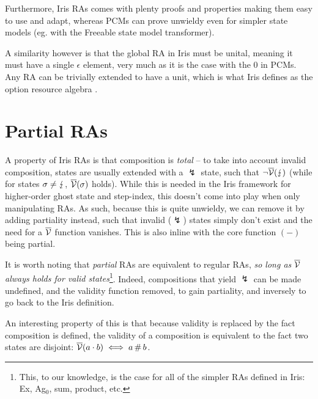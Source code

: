 Furthermore, Iris RAs comes with plenty proofs and properties making them easy to use and adapt, whereas PCMs can prove unwieldy even for simpler state models (eg. with the Freeable state model transformer).

A similarity however is that the global RA in Iris must be unital, meaning it must have a single $\epsilon$ element, very much as it is the case with the 0 in PCMs. Any RA can be trivially extended to have a unit, which is what Iris defines as the option resource algebra \cite{iris-option}.

\section{Partial RAs}

A property of Iris RAs is that composition is \emph{total} -- to take into account invalid composition, states are usually extended with a $\lightning$ state, such that $\neg \overline{\cal V}(\lightning)$ (while for states $\sigma\neq\lightning$, $\overline{\cal V}(\sigma)$ holds). While this is needed in the Iris framework for higher-order ghost state and step-index, this doesn't come into play when only manipulating RAs. As such, because this is quite unwieldy, we can remove it by adding partiality instead, such that invalid ($\lightning$) states simply don't exist and the need for a $\overline{\cal V}$ function vanishes. This is also inline with the core function $(-)$ being partial.

It is worth noting that \emph{partial} RAs are equivalent to regular RAs, \emph{so long as $\overline{\cal V}$ always holds for valid states}\footnote{This, to our knowledge, is the case for all of the simpler RAs defined in Iris: Ex, Ag${}_0$, sum, product, etc.}. Indeed, compositions that yield $\lightning$ can be made undefined, and the validity function removed, to gain partiality, and inversely to go back to the Iris definition.

An interesting property of this is that because validity is replaced by the fact composition is defined, the validity of a composition is equivalent to the fact two states are disjoint: $\overline{\cal V}(a\cdot b) \iff a \operatorname{\#} b$.

